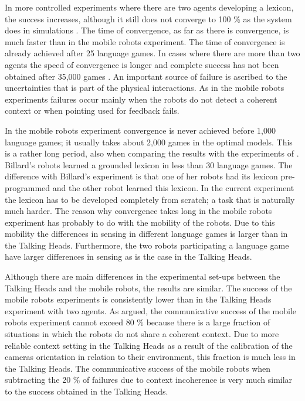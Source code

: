 In more controlled experiments where there are two agents developing a lexicon, the success increases, although it still does not converge to 100 \% as the system does in simulations \citep{steels:2000}. The time of convergence, as far as there is convergence, is much faster than in the mobile robots experiment. The time of convergence is already achieved after 25 language games. In cases where there are more than two agents the speed of convergence is longer and complete success has not been obtained after 35,000 games \citep{steels:2000}.  An important source of failure is ascribed to the uncertainties that is part of the physical interactions. As in the mobile robots experiments failures occur mainly when the robots do not detect a coherent context or when pointing used for feedback fails.

In the mobile robots experiment convergence is never achieved before 1,000 language games; it usually takes about 2,000 games in the optimal models. This is a rather long period, also when comparing the results with the experiments of \citet{billard:1999}. Billard's robots learned a grounded lexicon in less than 30 language games. The difference with Billard's experiment is that one of her robots had its lexicon pre-programmed and the other robot learned this lexicon. In the current experiment the lexicon has to be developed completely from scratch; a task that is naturally much harder. The reason why convergence takes long in the mobile robots experiment has probably to do with the mobility of the robots. Due to this mobility the differences in sensing in different language games is larger than in the Talking Heads. Furthermore, the two robots participating a language game have larger differences in sensing as is the case in the Talking Heads.


Although there are main differences in the experimental set-ups between the Talking Heads and the mobile robots, the results are similar. The success of the mobile robots experiments is consistently lower than in the Talking Heads experiment with two agents. As argued, the communicative success of the mobile robots experiment cannot exceed 80 \% because there is a large fraction of situations in which the robots do not share a coherent context. Due to more reliable context setting in the Talking Heads as a result of the calibration of the cameras orientation in relation to their environment, this fraction is much less in the Talking Heads. The communicative success of the mobile robots when subtracting the 20 \% of failures due to context incoherence is very much similar to the success obtained in the Talking Heads. 


